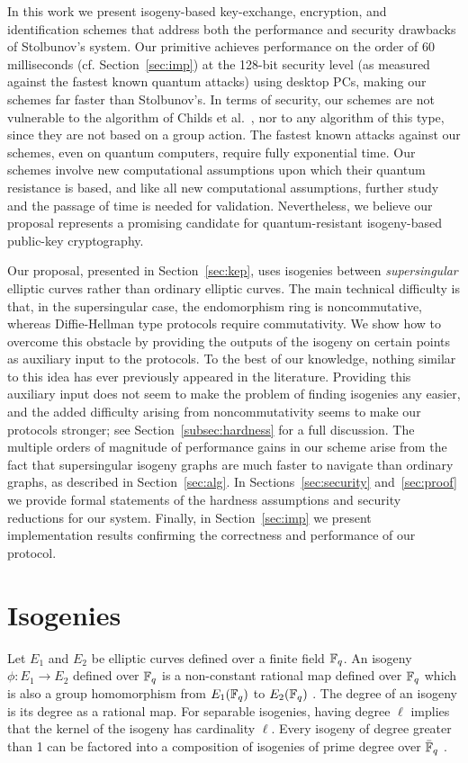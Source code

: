 In this work we present isogeny-based key-exchange, encryption, and
identification schemes that address both the performance and security
drawbacks of Stolbunov's system. Our primitive achieves performance on
the order of 60 milliseconds (cf. Section~\ref{sec:imp}) at the
128-bit security level (as measured against the fastest known quantum
attacks) using desktop PCs, making our schemes far faster than
Stolbunov's. In terms of security, our schemes are not vulnerable to
the algorithm of Childs et al.~\cite{CJS}, nor to any algorithm of
this type, since they are not based on a group action. The fastest
known attacks against our schemes, even on quantum computers, require
fully exponential time. Our schemes involve new computational
assumptions upon which their quantum resistance is based, and like all
new computational assumptions, further study and the passage of time
is needed for validation. Nevertheless, we believe our proposal
represents a promising candidate for quantum-resistant isogeny-based
public-key cryptography.

Our proposal, presented in Section~\ref{sec:kep}, uses isogenies
between \emph{supersingular} elliptic curves rather than ordinary
elliptic curves. The main technical difficulty is that, in the
supersingular case, the endomorphism ring is noncommutative, whereas
Diffie-Hellman type protocols require commutativity. We show how to
overcome this obstacle by providing the outputs of the isogeny on
certain points as auxiliary input to the protocols. To the best of our
knowledge, nothing similar to this idea has ever previously appeared
in the literature. Providing this auxiliary input does not seem to
make the problem of finding isogenies any easier, and the added
difficulty arising from noncommutativity seems to make our protocols
stronger; see Section~\ref{subsec:hardness} for a full discussion. The
multiple orders of magnitude of performance gains in our scheme arise
from the fact that supersingular isogeny graphs are much faster to
navigate than ordinary graphs, as described in
Section~\ref{sec:alg}. In Sections~\ref{sec:security}
and~\ref{sec:proof} we provide formal statements of the hardness
assumptions and security reductions for our system. Finally, in
Section~\ref{sec:imp} we present implementation results confirming the
correctness and performance of our protocol.


\section{Isogenies}\label{isogenies}
Let $E_1$ and $E_2$ be elliptic curves defined over a finite field
${\mathbb{F}}_q$.
An isogeny $\phi: E_1 \rightarrow E_2$ defined over ${\mathbb{F}}_q$ is a
non-constant rational map defined over ${\mathbb{F}}_q$ which is also a group
homomorphism from $E_1({\mathbb{F}}_q)$ to $E_2({\mathbb{F}}_q)$ \cite[III.4]{Sil}. The
degree of an isogeny is its degree as a rational map.  For separable
isogenies, having degree $\ell$ implies that the kernel of the
isogeny has cardinality $\ell$.
Every isogeny of degree greater than 1 can be factored into a
composition of isogenies of prime degree over $\bar{{\mathbb{F}}}_q$
\cite{Couv}.

